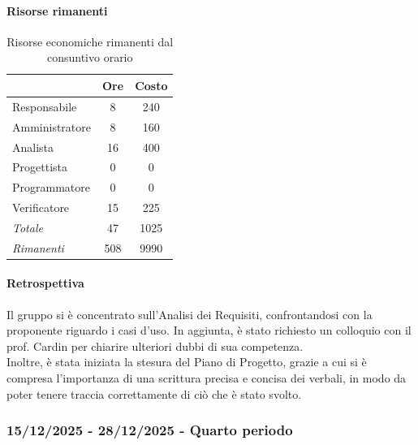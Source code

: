 \documentclass[a4paper,12pt]{article}
\begin{document}
            \paragraph{Risorse rimanenti}
                \begin{table}[H]
                \centering
                \caption{Risorse economiche rimanenti dal consuntivo orario}
                \begin{tabular}{|l|c|c|}
                \hline
                    \rowcolor{lightgray}{\textbf{Ruolo}} & {\textbf{Ore}} & {\textbf{Costo}}\\
                \hline
                    Responsabile & 8 & 240\\
                \hline
                    Amministratore & 8 & 160\\
                \hline
                    Analista & 16 & 400\\
                \hline
                    Progettista & 0 & 0\\
                \hline
                    Programmatore & 0 & 0\\
                \hline
                    Verificatore & 15 & 225\\
                \hline
                    \rowcolor{lightgray}\textit{Totale} & 47 & 1025\\
                \hline
                    \rowcolor{lightgray}\textit{Rimanenti} & 508 & 9990\\
                \hline
                \end{tabular}
                \end{table}
                
            \paragraph{Retrospettiva}
            Il gruppo si è concentrato sull'Analisi dei Requisiti, confrontandosi con la proponente riguardo i casi d'uso. In aggiunta, è stato richiesto un colloquio con il prof. Cardin per chiarire ulteriori dubbi di sua competenza.
            \\Inoltre, è stata iniziata la stesura del Piano di Progetto, grazie a cui si è compresa l'importanza di una scrittura precisa e concisa dei verbali, in modo da poter tenere traccia correttamente di ciò che è stato svolto.

        \subsubsection{15/12/2025 - 28/12/2025 - Quarto periodo}
\end{document}
